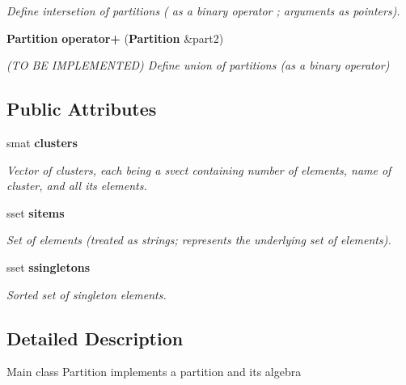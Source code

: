 \begin{CompactItemize}
\begin{CompactList}\small\item\em Define intersetion of partitions ( as a binary operator ; arguments as pointers). \item\end{CompactList}\item 
{\bf Partition} {\bf operator+} ({\bf Partition} \&part2)
\begin{CompactList}\small\item\em (TO BE IMPLEMENTED) Define union of partitions (as a binary operator) \item\end{CompactList}\end{CompactItemize}
\subsection*{Public Attributes}
\begin{CompactItemize}
\item 
smat {\bf clusters}\label{classPartition_o0}

\begin{CompactList}\small\item\em Vector of clusters, each being a svect containing number of elements, name of cluster, and all its elements. \item\end{CompactList}\item 
sset {\bf sitems}\label{classPartition_o1}

\begin{CompactList}\small\item\em Set of elements (treated as strings; represents the underlying set of elements). \item\end{CompactList}\item 
sset {\bf ssingletons}\label{classPartition_o2}

\begin{CompactList}\small\item\em Sorted set of singleton elements. \item\end{CompactList}\end{CompactItemize}


\subsection{Detailed Description}
Main class Partition implements a partition and its algebra 



